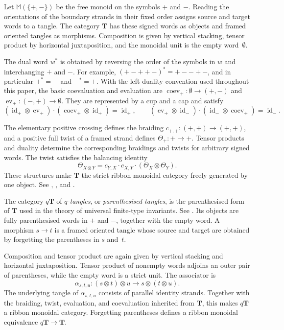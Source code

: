 \documentclass{amsart}
\newcommand{\bT}{\mathbf{T}}
\newcommand{\id}{\operatorname{id}}
\newcommand{\ev}{\operatorname{ev}}
\newcommand{\coev}{\operatorname{coev}}
\theoremstyle{definition}
\numberwithin{equation}{section}
\begin{document}
Let $\mathbb M(\{+,-\})$ be the free monoid on the symbols $+$ and
$-$. Reading the orientations of the boundary strands in their
fixed order assigns source and target words to a tangle. The
category $\bT$ has these signed words as objects and framed
oriented tangles as morphisms. Composition is given by vertical
stacking, tensor product by horizontal juxtaposition, and the
monoidal unit is the empty word~$\emptyset$.

The dual word $w^*$ is obtained by reversing the order of the
symbols in $w$ and interchanging $+$ and $-$. For example,
$(+-++-)^*=+--+-$, and in particular $+^*=-$ and $-^*=+$.
With the left-duality convention used throughout this paper,
the basic coevaluation and evaluation are
$\coev_+\colon\emptyset\to(+,-)$ and
$\ev_+\colon(-,+)\to\emptyset$. They are represented by a cup
and a cap and satisfy
\[
(\id_+\otimes\ev_+)\cdot(\coev_+\otimes\id_+)=\id_+,
\qquad
(\ev_+\otimes\id_-)\cdot(\id_-\otimes\coev_+)=\id_-.
\]

The elementary positive crossing defines the braiding
$c_{+,+}\colon(+,+)\to(+,+)$, and a positive full twist
of a framed strand defines $\Theta_+\colon+\to+$.
Tensor products and duality determine the corresponding
braidings and twists for arbitrary signed words.
The twist satisfies the balancing identity
\[
\Theta_{X\otimes Y}
=
c_{Y,X}\cdot c_{X,Y}\cdot(\Theta_X\otimes\Theta_Y).
\]
These structures make $\bT$ the strict ribbon monoidal category
freely generated by one object. See \cite{shum_tortile_1994},
\cite[Chapter~XII.2]{kassel_quantum_1995}, and
\cite[Section~3.5]{KT_Tangles}.

The category $q\bT$ of \emph{$q$-tangles}, or
\emph{parenthesised tangles}, is the parenthesised form of $\bT$
used in the theory of universal finite-type invariants. See
\cite{BN_weak_tangles,Le_Murakami_1996,KT_Tangles,qtanglesbook}.
Its objects are fully parenthesised words in $+$ and $-$,
together with the empty word. A morphism $s\to t$ is a framed
oriented tangle whose source and target are obtained by
forgetting the parentheses in $s$ and~$t$.

Composition and tensor product are again given by vertical
stacking and horizontal juxtaposition. Tensor product of
nonempty words adjoins an outer pair of parentheses, while
the empty word is a strict unit. The associator is
\[
\alpha_{s,t,u}\colon
(s\otimes t)\otimes u
\longrightarrow
s\otimes(t\otimes u).
\]
The underlying tangle of $\alpha_{s,t,u}$ consists of parallel
identity strands. Together with the braiding, twist, evaluation,
and coevaluation inherited from $\bT$, this makes $q\bT$ a
ribbon monoidal category. Forgetting parentheses defines a
ribbon monoidal equivalence $q\bT\to\bT$.
\end{document}
